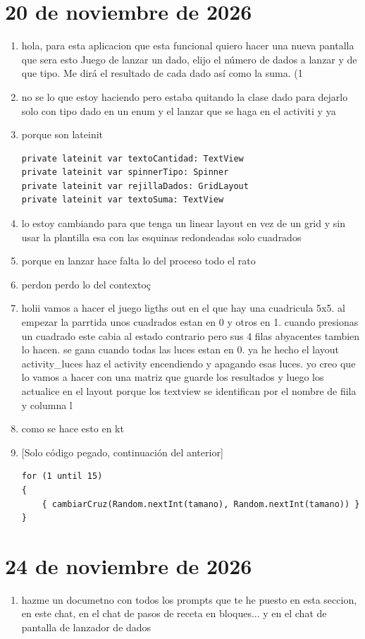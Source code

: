 \section{20 de noviembre de 2026}
\begin{enumerate}[resume]
  \item hola, para esta aplicacion que esta funcional quiero hacer una nueva pantalla que sera esto Juego de lanzar un dado, elijo el número de dados a lanzar y de que tipo. Me dirá el resultado de cada dado así como la suma. (1
  \item no se lo que estoy haciendo pero estaba quitando la clase dado para dejarlo solo con tipo dado en un enum y el lanzar que se haga en el activiti y ya
  \item porque son lateinit
\begin{lstlisting}
private lateinit var textoCantidad: TextView
private lateinit var spinnerTipo: Spinner
private lateinit var rejillaDados: GridLayout
private lateinit var textoSuma: TextView
\end{lstlisting}
  \item lo estoy cambiando para que tenga un linear layout en vez de un grid y sin usar la plantilla esa con las esquinas redondeadas solo cuadrados
  \item porque en lanzar hace falta lo del proceso todo el rato
  \item perdon perdo lo del contextoç
  \item holii vamos a hacer el juego ligths out en el que hay una cuadricula 5x5. al empezar la parrtida unos cuadrados estan en 0 y otros en 1. cuando presionas un cuadrado este cabia al estado contrario pero sus 4 filas abyacentes tambien lo hacen. se gana cuando todas las luces estan en 0. ya he hecho el layout activity\_luces haz el activity encendiendo y apagando esas luces. yo creo que lo vamos a hacer con una matriz que guarde los resultados y luego los actualice en el layout porque los textview se identifican por el nombre de fiila y columna l
  \item como se hace esto en kt
  \item {[}Solo código pegado, continuación del anterior{]}
\begin{lstlisting}
for (1 until 15)
{
    { cambiarCruz(Random.nextInt(tamano), Random.nextInt(tamano)) }
}
\end{lstlisting}
\end{enumerate}

\section{24 de noviembre de 2026}
\begin{enumerate}[resume]
  \item hazme un documetno con todos los prompts que te he puesto en esta seccion, en este chat, en el chat de pasos de receta en bloques... y en el chat de pantalla de lanzador de dados
\end{enumerate}